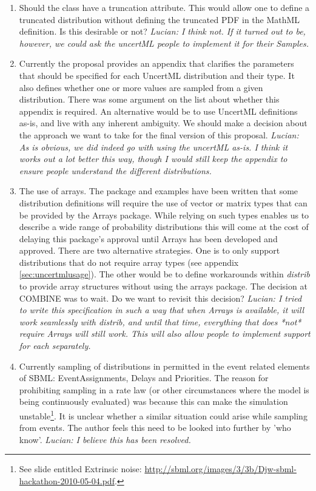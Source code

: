 \documentclass[draftspec]{sbmlpkgspec}
\newcommand{\distribshort}{\emph{distrib}\xspace}
\newcommand{\mathml}{MathML\xspace}
\newcommand{\uncertml}{UncertML\xspace}
\begin{document}
\begin{enumerate}
\item Should the  class have a truncation
  attribute. This would allow one to define a truncated distribution
  without defining the truncated PDF in the \mathml definition. Is
  this desirable or not?
  \emph{Lucian:  I think not.  If it turned out to be, however, we could ask the uncertML people to implement it for their Samples.}
\item Currently the proposal provides an appendix that clarifies the
  parameters that should be specified for each \uncertml distribution and their
  type. It also defines whether one or more values are sampled from a
  given distribution. There was some argument on the list about
  whether this appendix is required. An alternative would be to use
  \uncertml definitions as-is, and live with any inherent
  ambiguity. We should make a decision about the approach we want to
  take for the final version of this proposal.
  \emph{Lucian:  As is obvious, we did indeed go with using the uncertML as-is.  I think it works out a lot better this way, though I would still keep the appendix to ensure people understand the different distributions.}
\item The use of arrays. The package and examples have been written
  that some distribution definitions will require the use of vector or
  matrix types that can be provided by the Arrays package. While
  relying on such types enables us to describe a wide range of
  probability distributions this will come at the cost of delaying
  this package's approval until Arrays has been developed and
  approved. There are two alternative strategies. One is to only
  support distributions that do not require array types (see appendix
  \ref{sec:uncertmlusage}). The other would be to define workarounds
  within \distribshort to provide array structures without using the
  arrays package. The decision at COMBINE was to wait. Do we want to
  revisit this decision?
  \emph{Lucian:  I tried to write this specification in such a way that when Arrays is available, it will work seamlessly with distrib, and until that time, everything that does *not* require Arrays will still work.  This will also allow people to implement support for each separately.}
\item Currently sampling of distributions in permitted in the event
  related elements of SBML: EventAssignments, Delays and
Priorities. The reason for prohibiting sampling in a rate law (or other
circumstances where the model is being continuously evaluated) was
because this can make the simulation unstable\footnote{See slide entitled Extrinsic
  noise:
  \url{http://sbml.org/images/3/3b/Djw-sbml-hackathon-2010-05-04.pdf}.}. It
is unclear whether a similar situation could arise while sampling from
events. The author feels this need to be looked into further by 'who
know'.
  \emph{Lucian:  I believe this has been resolved.}


\end{enumerate}
\end{document}

